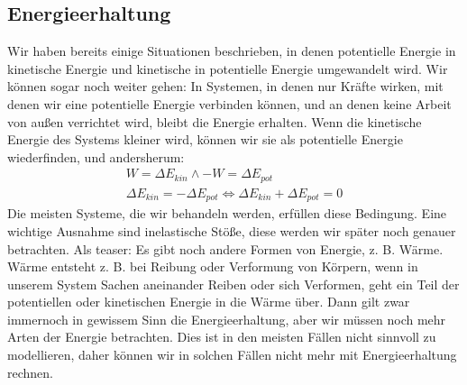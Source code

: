 \documentclass[11pt]{article}
\begin{document}
\subsection{Energieerhaltung}
Wir haben bereits einige Situationen beschrieben, in denen potentielle Energie in kinetische Energie und kinetische in potentielle Energie umgewandelt wird. Wir können sogar noch weiter gehen: In Systemen, in denen nur Kräfte wirken, mit denen wir eine potentielle Energie verbinden können, und an denen keine Arbeit von außen verrichtet wird, bleibt die Energie erhalten. Wenn die kinetische Energie des Systems kleiner wird, können wir sie als potentielle Energie wiederfinden, und andersherum:
\begin{gather*}
    W = \Delta E_{kin} \land -W = \Delta E_{pot} \\
    \Delta E_{kin} = -\Delta E_{pot} \iff \Delta E_{kin} + \Delta E_{pot} = 0 
\end{gather*}
Die meisten Systeme, die wir behandeln werden, erfüllen diese Bedingung. Eine wichtige Ausnahme sind inelastische Stöße, diese werden wir später noch genauer betrachten. Als teaser: Es gibt noch andere Formen von Energie, z. B. Wärme. Wärme entsteht z. B. bei Reibung oder Verformung von Körpern, wenn in unserem System Sachen aneinander Reiben oder sich Verformen, geht ein Teil der potentiellen oder kinetischen Energie in die Wärme über. Dann gilt zwar immernoch in gewissem Sinn die Energieerhaltung, aber wir müssen noch mehr Arten der Energie betrachten. Dies ist in den meisten Fällen nicht sinnvoll zu modellieren, daher können wir in solchen Fällen nicht mehr mit Energieerhaltung rechnen. 
\end{document}
